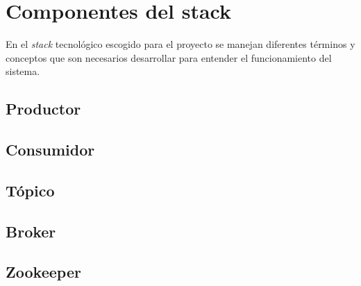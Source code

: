 \section{Componentes del stack}\label{sec:componentes}
En el \textit{stack} tecnológico escogido para el proyecto se manejan
diferentes términos y conceptos que son necesarios desarrollar para
entender el funcionamiento del sistema.

\subsection{Productor}\label{subsec:productor}


\subsection{Consumidor}\label{subsec:consumidor}


\subsection{Tópico}\label{subsec:topico}


\subsection{Broker}\label{subsec:broker}


\subsection{Zookeeper}\label{subsec:zookeeper}
